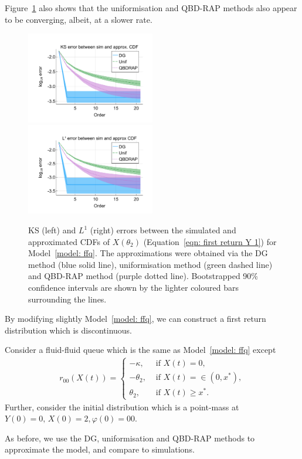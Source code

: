 Figure~\ref{fig: ffq return cts} also shows that the uniformisation and QBD-RAP methods also appear to be converging, albeit, at a slower rate. 
\begin{figure}
	\centering
	\includegraphics[width=0.5\textwidth,trim={0.75cm 0.8cm 0.25cm 1.25cm},clip]{chapter6/figs/ffq/cts/ks_error_formatted.pdf}%
	\includegraphics[width=0.5\textwidth,trim={0.75cm 0.8cm 0.25cm 1.25cm},clip]{chapter6/figs/ffq/cts/l1_cdf_error_formatted.pdf}
	\caption{KS (left) and \(L^1\) (right) errors between the simulated and approximated CDFs of \(X(\theta_2)\) (Equation~\ref{eqn: first return Y 1}) for Model~\ref{model: ffq}. The approximations were obtained via the DG method (blue solid line), uniformisation method (green dashed line) and QBD-RAP method (purple dotted line). Bootstrapped 90\% confidence intervals are shown by the lighter coloured bars surrounding the lines.} 
	\label{fig: ffq return cts} 
\end{figure}

By modifying slightly Model~\ref{model: ffq}, we can construct a first return distribution which is discontinuous. 
\begin{model}\label{model: ffq2}
	Consider a fluid-fluid queue which is the same as Model~\ref{model: ffq} except 
	\begin{align}
		r_{00}(X(t)) = \begin{cases}
			-\kappa, & \mbox{ if }X(t)=0,\\
			-\theta_2, & \mbox{ if }X(t)=\in(0,x^*),\\
			\theta_2, & \mbox{ if }X(t)\geq x^*.
		\end{cases}
	\end{align}
	Further, consider the initial distribution which is a point-mass at \(Y(0)=0,\, X(0)=2, \varphi(0)=00\).
\end{model}
As before, we use the DG, uniformisation and QBD-RAP methods to approximate the model, and compare to simulations. 

